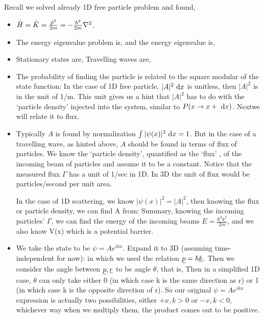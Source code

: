 \documentclass{school-22.101-notes}
\begin{document}
Recall we solved already 1D free particle problem and found, 
\begin{itemize}
\item $\hat{H} = \hat{K} = \frac{\hat{p}^2}{2m} = - \frac{\hbar^2}{2m} \nabla^2$. 

\item The energy eigenvalue problem is, 
  and the energy eigenvalue is, 

\item Stationary states are, 
  Travelling waves are, 

\item The probability of finding the particle is related to the square modular of the state function:
In the case of 1D free particle, $|A|^2 \mbox{ }\mathrm{d} x$ is unitless, then $|A|^2$ is in the unit of 1/m. This unit gives us a hint that $|A|^2$ has to do with the `particle density' injected into the system, similar to $P(x\to x+\mbox{ }\mathrm{d} x)$. Nextwe will relate it to flux. 

\item Typically $A$ is found by normalization $\int |\psi(x)|^2 \mbox{ }\mathrm{d} x = 1$. But in the case of a travelling wave, as hinted above, $A$ should be found in terms of flux of particles. We know the `particle density', quantified as the `flux' , of the incoming beam of particles and assume it to be a constant. 
Notice that the measured flux $\Gamma$ has a unit of 1/sec in 1D. In 3D the unit of flux would be particles/second per unit area. 

In the case of 1D scattering, we know $|\psi(x)|^2 = |A|^2$, then knowing the flux or particle density, we can find A from:
Summary, knowing the incoming particles' $\Gamma$, we can find the energy of the incoming beams $E = \frac{\hbar^2 k^2}{2m}$, and we also know V(x) which is a potential barrier.

\item We take the state to be $\psi = A e^{ikx}$. Expand it to 3D (assuming time-independent for now):
in which we used the relation $\underline{p} = \hbar \underline{k}$. Then we consider the angle between $\underline{p}, \underline{r}$ to be angle $\theta$, that is, 
Then in a simplified 1D case, $\theta$ can only take either 0 (in which case k is the same direction as r) or 1 (in which case k is the opposite direction of r). So our original $\psi = A e^{ikx}$ expression is actually two possibilities, either $+x, k>0$ or $-x, k<0$, whichever way when we multiply them, the product comes out to be positive. 
\end{itemize}
\end{document}

